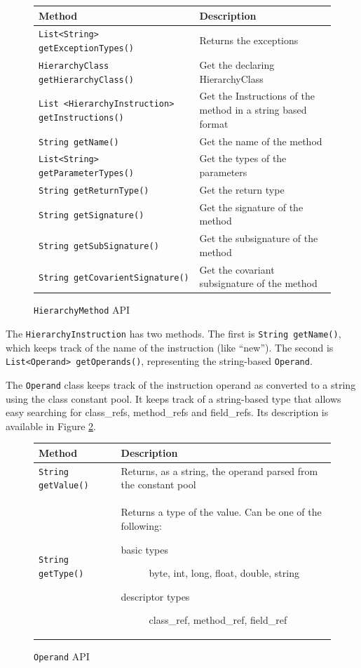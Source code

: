 \documentclass[preprint]{sigplanconf}
\begin{document}
\begin{figure}[htbf]
\begin{tabularx}{\columnwidth}{|XX|}
\hline
{\bf Method} & {\bf Description }\\\hline
{\tt List<String> getExceptionTypes()} &  Returns the exceptions\\\hline 
{\tt HierarchyClass getHierarchyClass()} & Get
   the declaring HierarchyClass\\\hline 
{\tt List
    <HierarchyInstruction>
    getInstructions()} & Get the 
    Instructions of the method in a string based format\\\hline 
{\tt String getName()} & Get the name of the method\\\hline 
{\tt List<String> getParameterTypes()} & Get the types of the parameters\\\hline
{\tt String getReturnType()} & Get the return type\\\hline
{\tt String getSignature()} & Get the signature of the method\\\hline  
{\tt String getSubSignature()} & Get the subsignature of the method\\\hline
{\tt String getCovarientSignature()} & Get the covariant subsignature of the method\\\hline
\end{tabularx}
\caption{{\tt HierarchyMethod} API}
\label{fig:rbhm}
\end{figure}

The {\tt HierarchyInstruction} has two methods. The first is {\tt String getName()}, which keeps track of the name of the instruction (like “new”). The second is {\tt List<Operand> getOperands()}, representing the string-based {\tt Operand}.

The {\tt Operand} class keeps track of the instruction operand as converted to a string using the class constant pool. It keeps track of a string-based type that allows easy searching for class\_refs, method\_refs and field\_refs. Its description is available in Figure \ref{fig:operand}. 

\begin{figure}[htbf]
\begin{tabularx}{\columnwidth}{|lX|}
\hline
{\bf Method} & {\bf Description }\\\hline
{\tt String getValue()} &  Returns, as a string, the operand parsed 
    from the constant pool\\\hline 
{\tt String getType()} & Returns a type of the value. Can be one
    of the following:
    \begin{description}
      \item[basic types] byte, int, long, float, double, string
      \item[descriptor types] class\_ref, method\_ref, field\_ref
    \end{description}
\\\hline 
\end{tabularx}
\caption{{\tt Operand} API}
\label{fig:operand}
\end{figure}
\end{document}
